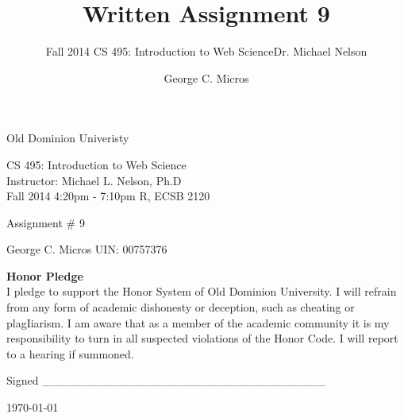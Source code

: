 \documentclass[]{svmono}
\begin{document}
\begin{titlepage}    
\begin{center}
\vspace*{0in}
\huge{\sc  Old Dominion Univeristy\\  }



\vspace{1in}
\Large{\sc CS 495: Introduction to Web Science \\ Instructor: Michael L. Nelson, Ph.D \\ Fall 2014 4:20pm - 7:10pm R, ECSB 2120\\}

\vspace{1in}
\Large{Assignment \# 9\\}

\vspace{.5cm}
\Large{ \sc George C.  Micros  UIN: 00757376\\ }



\vspace {7cm}

{\large \bf {Honor Pledge}}\\
{I pledge to support the Honor System of Old Dominion University. I will refrain from any form of academic dishonesty or deception, such as cheating or plagIiarism. I am aware that as a member of the academic community it is my responsibility to turn in all suspected violations of the Honor Code. I will report to a hearing if summoned. }\\
\vspace {.5cm}

{Signed \_\_\_\_\_\_\_\_\_\_\_\_\_\_\_\_\_\_\_\_\_\_\_\_\_\_\_\_\_\_\_\_\_\_}


\today
\end{center}
\end{titlepage}



\author{George C. Micros}
\title{Written Assignment 9}
\subtitle{Fall 2014 \newline  CS 495: Introduction to Web Science\newline Dr. Michael Nelson}
\maketitle


\tableofcontents
\end{document}
